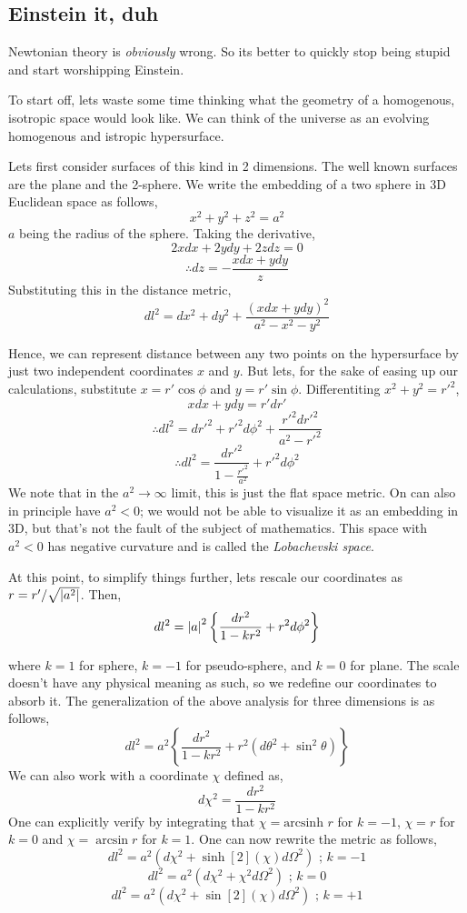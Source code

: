 \documentclass[a4paper,11pt]{article}
\begin{document}
\subsection{Einstein it, duh}
Newtonian theory is \textit{obviously} wrong. So its better to quickly stop being stupid and start worshipping Einstein.

To start off, lets waste some time thinking what the geometry of a homogenous, isotropic space would look like. We can think of the universe as an evolving homogenous and istropic hypersurface.

Lets first consider surfaces of this kind in 2 dimensions. The well known surfaces are the plane and the 2-sphere. We write the embedding of a two sphere in 3D Euclidean space as follows,
$$x^2 + y^2 + z^2 = a^2$$
$a$ being the radius of the sphere. Taking the derivative,
$$2x dx + 2y dy +2z dz = 0$$
$$\therefore dz = -\frac{xdx + ydy}{z}$$
Substituting this in the distance metric,
$$dl^2 = dx^2 + dy^2 + \frac{(xdx + ydy)^2}{a^2 - x^2 - y^2}$$

Hence, we can represent distance between any two points on the hypersurface by just two independent coordinates $x$ and $y$. But lets, for the sake of easing up our calculations, substitute $x = r' \cos\phi$ and $y = r' \sin \phi$. Differentiting $x^2 + y^2 = r'^2$,
$$xdx + ydy = r' dr'$$
$$\therefore dl^2 = dr'^2 + r'^2d\phi^2 + \frac{r'^2 dr'^2}{a^2 - r'^2}$$
$$\therefore dl^2 = \frac{dr'^2 }{1 - \frac{r'^2}{a^2}} + r'^2d\phi^2 $$
We note that in the $a^2 \rightarrow \infty$ limit, this is just the flat space metric. On can also in principle have $a^2 < 0$; we would not be able to visualize it as an embedding in 3D, but that's not the fault of the subject of mathematics. This space with $a^2 < 0$ has negative curvature and is called the \textit{Lobachevski space}.

At this point, to simplify things further, lets rescale our coordinates as $r = r'/\sqrt{\abs{a^2}}$. Then,
$$dl^2 = \abs{a}^2\left\{\frac{dr^2}{1 - k{r^2}} + r^2d\phi^2 \right\}$$

where $k=1$ for sphere, $k=-1$ for pseudo-sphere, and $k=0$ for plane. The scale doesn't have any physical meaning as such, so we redefine our coordinates to absorb it. The generalization of the above analysis for three dimensions is as follows,
$$dl^2 = a^2\left\{\frac{dr^2}{1 - k{r^2}} + r^2(d\theta^2 + \sin^2\theta) \right\}$$
We can also work with a coordinate $\chi$ defined as,
$$d\chi^2 = \frac{dr^2}{1-kr^2}$$ One can explicitly verify by integrating that $\chi = \text{arcsinh } r$ for $k = -1$, $\chi = r$ for $k=0$ and $\chi = \arcsin r$ for $k=1$. One can now rewrite the metric as follows,
$$dl^2 = a^2(d\chi^2 + \sinh[2](\chi)d \Omega^2) \text{ ; } k = -1$$
$$dl^2 = a^2(d\chi^2 + \chi^2 d \Omega^2) \text{ ; } k = 0$$
$$dl^2 = a^2(d\chi^2 + \sin[2](\chi)d \Omega^2) \text{ ; } k = +1$$
\end{document}
